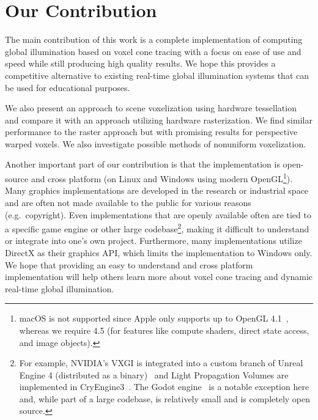\section{Our Contribution}
The main contribution of this work is a complete implementation of computing global illumination based on voxel cone tracing with a focus on ease of use and speed while still producing high quality results. We hope this provides a competitive alternative to existing real-time global illumination systems that can be used for educational purposes.

 We also present an approach to scene voxelization using hardware tessellation and compare it with an approach utilizing hardware rasterization. We find similar performance to the raster approach but with promising results for perspective warped voxels. We also investigate possible methods of nonuniform voxelization.


Another important part of our contribution is that the implementation is open-source and cross platform (on Linux and Windows using modern OpenGL\footnote{macOS is not supported since Apple only supports up to OpenGL 4.1~\cite{appleopenglsupport}, whereas we require 4.5 (for features like compute shaders, direct state access, and image objects).}). Many graphics implementations are developed in the research or industrial space and are often not made available to the public for various reasons (e.g.\ copyright). Even implementations that are openly available often are tied to a specific game engine or other large codebase\footnote{For example, NVIDIA's VXGI is integrated into a custom branch of Unreal Engine 4 (distributed as a binary)~\cite{nvidiavxgi} and Light Propagation Volumes are implemented in CryEngine3~\cite{kaplanyan2009light}. The Godot engine~\cite{godotengine} is a notable exception here and, while part of a large codebase, is relatively small and is completely open source.}, making it difficult to understand or integrate into one's own project. Furthermore, many implementations utilize DirectX as their graphics API, which limits the implementation to Windows only. We hope that providing an easy to understand and cross platform implementation will help others learn more about voxel cone tracing and dynamic real-time global illumination.
